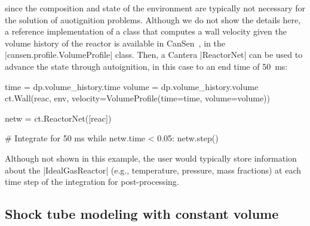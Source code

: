 \documentclass[12pt]{ijck}
\begin{document}
since the composition and state of the environment are typically not necessary for the solution of
auotignition problems. Although we do not show the details here, a reference implementation of a
class that computes a wall velocity given the volume history of the reactor is available in
CanSen~\autocite{cansen}, in the \pybox|cansen.profile.VolumeProfile| class. Then, a Cantera
\pybox|ReactorNet| can be used to advance the state through autoignition, in this case to an end
time of \SI{50}{\milli\second}:
%
\begin{pythonbox}
time = dp.volume_history.time
volume = dp.volume_history.volume
ct.Wall(reac, env, velocity=VolumeProfile(time=time, volume=volume))

netw = ct.ReactorNet([reac])

# Integrate for 50 ms
while netw.time < 0.05:
    netw.step()
\end{pythonbox}
%
Although not shown in this example, the user would typically store information
about the \pybox|IdealGasReactor| (e.g., temperature, pressure, mass fractions)
at each time step of the integration for post-processing.

\subsection{Shock tube modeling with constant volume}\label{sec:shock-tube}
\end{document}
